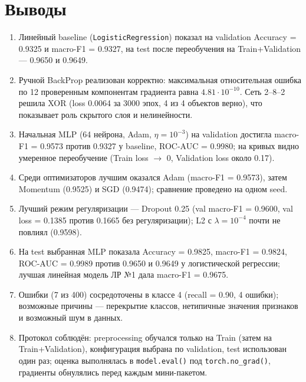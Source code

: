 \documentclass[oneside,a4paper,14pt]{extarticle}
\begin{document}
\section*{Выводы}
\begin{enumerate}
    \item Линейный baseline (\texttt{Logistic\-Regression}) показал на validation Accuracy = 0.9325 и macro-F1 = 0.9327, на test после переобучения на Train+Validation --- 0.9650 и 0.9649.
    \item Ручной BackProp реализован корректно: максимальная относительная ошибка по 12 проверенным компонентам градиента равна $4.81\cdot10^{-10}$. Сеть 2--8--2 решила XOR (loss 0.0064 за 3000 эпох, 4 из 4 объектов верно), что показывает роль скрытого слоя и нелинейности.
    \item Начальная MLP (64 нейрона, Adam, $\eta=10^{-3}$) на validation достигла macro-F1 = 0.9573 против 0.9327 у baseline, ROC-AUC = 0.9980; на кривых видно умеренное переобучение (Train loss $\to$ 0, Validation loss около 0.17).
    \item Среди оптимизаторов лучшим оказался Adam (macro-F1 = 0.9573), затем Momentum (0.9525) и SGD (0.9474); сравнение проведено на одном seed.
    \item Лучший режим регуляризации --- Dropout 0.25 (val macro-F1 = 0.9600, val loss = 0.1385 против 0.1665 без регуляризации); L2 с $\lambda=10^{-4}$ почти не повлиял (0.9598).
    \item На test выбранная MLP показала Accuracy = 0.9825, macro-F1 = 0.9824, ROC-AUC = 0.9989 против 0.9650 и 0.9649 у логистической регрессии; лучшая линейная модель ЛР №1 дала macro-F1 = 0.9675.
    \item Ошибки (7 из 400) сосредоточены в классе 4 (recall = 0.90, 4 ошибки); возможные причины --- перекрытие классов, нетипичные значения признаков и возможный шум в данных.
    \item Протокол соблюдён: preprocessing обучался только на Train (затем на Train+Validation), конфигурация выбрана по validation, test использован один раз; оценка выполнялась в \texttt{model.eval()} под \texttt{torch.no\_grad()}, градиенты обнулялись перед каждым мини-пакетом.
\end{enumerate}
\end{document}

